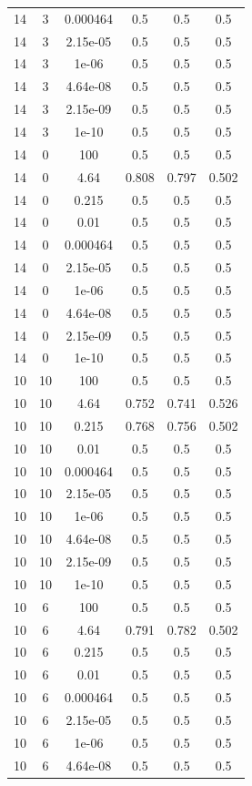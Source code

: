 \begin{table}[ht]
\begin{tabular}{ |c|c|c|c|c|c| }
14 & 3 & 0.000464 & 0.5 & 0.5 & 0.5 \\
14 & 3 & 2.15e-05 & 0.5 & 0.5 & 0.5 \\
14 & 3 & 1e-06 & 0.5 & 0.5 & 0.5 \\
14 & 3 & 4.64e-08 & 0.5 & 0.5 & 0.5 \\
14 & 3 & 2.15e-09 & 0.5 & 0.5 & 0.5 \\
14 & 3 & 1e-10 & 0.5 & 0.5 & 0.5 \\
14 & 0 & 100 & 0.5 & 0.5 & 0.5 \\
14 & 0 & 4.64 & 0.808 & 0.797 & 0.502 \\
14 & 0 & 0.215 & 0.5 & 0.5 & 0.5 \\
14 & 0 & 0.01 & 0.5 & 0.5 & 0.5 \\
14 & 0 & 0.000464 & 0.5 & 0.5 & 0.5 \\
14 & 0 & 2.15e-05 & 0.5 & 0.5 & 0.5 \\
14 & 0 & 1e-06 & 0.5 & 0.5 & 0.5 \\
14 & 0 & 4.64e-08 & 0.5 & 0.5 & 0.5 \\
14 & 0 & 2.15e-09 & 0.5 & 0.5 & 0.5 \\
14 & 0 & 1e-10 & 0.5 & 0.5 & 0.5 \\
10 & 10 & 100 & 0.5 & 0.5 & 0.5 \\
10 & 10 & 4.64 & 0.752 & 0.741 & 0.526 \\
10 & 10 & 0.215 & 0.768 & 0.756 & 0.502 \\
10 & 10 & 0.01 & 0.5 & 0.5 & 0.5 \\
10 & 10 & 0.000464 & 0.5 & 0.5 & 0.5 \\
10 & 10 & 2.15e-05 & 0.5 & 0.5 & 0.5 \\
10 & 10 & 1e-06 & 0.5 & 0.5 & 0.5 \\
10 & 10 & 4.64e-08 & 0.5 & 0.5 & 0.5 \\
10 & 10 & 2.15e-09 & 0.5 & 0.5 & 0.5 \\
10 & 10 & 1e-10 & 0.5 & 0.5 & 0.5 \\
10 & 6 & 100 & 0.5 & 0.5 & 0.5 \\
10 & 6 & 4.64 & 0.791 & 0.782 & 0.502 \\
10 & 6 & 0.215 & 0.5 & 0.5 & 0.5 \\
10 & 6 & 0.01 & 0.5 & 0.5 & 0.5 \\
10 & 6 & 0.000464 & 0.5 & 0.5 & 0.5 \\
10 & 6 & 2.15e-05 & 0.5 & 0.5 & 0.5 \\
10 & 6 & 1e-06 & 0.5 & 0.5 & 0.5 \\
10 & 6 & 4.64e-08 & 0.5 & 0.5 & 0.5 \\

\end{tabular}
\end{table}
